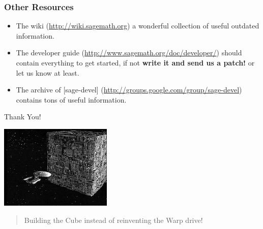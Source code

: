 \documentclass[11pt,blackandwhite]{beamer}
\renewcommand{\emph}[1]{{\color{black}\bf #1}}
\begin{document}
\begin{frame}
\frametitle{Other Resources}
\begin{itemize}
 \item The wiki (\url{http://wiki.sagemath.org}) a wonderful collection of
useful outdated information.
 \item The developer guide (\url{http://www.sagemath.org/doc/developer/})
should contain everything to get started, if not \emph{write it and send us a
patch!} or let us know at least.
 \item The archive of [sage-devel]
(\url{http://groups.google.com/group/sage-devel}) contains tons of useful
information.
\end{itemize}
 
\end{frame}



\begin{frame}{Thank You!}
\begin{center}
 \includegraphics[width=0.4\textwidth]{cube.jpg}\\
\begin{quote}
Building the Cube instead of reinventing the Warp drive!
\end{quote}

\end{center}

\end{frame}


% 
% 
\end{document}
